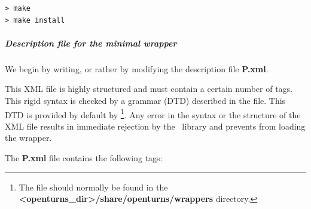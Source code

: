 \lstset{language=Bash, basicstyle=\normalsize}
\begin{lstlisting}[frame=TBRL]
> make
> make install
\end{lstlisting}

\subparagraph{Description file for the minimal wrapper}

We begin by writing, or rather by modifying the description file {\bf P.xml}.

This XML file is highly structured and must contain a certain number of tags. This rigid syntax is checked by a grammar (DTD) described in the  file. This DTD is provided by default by \OT\footnote{The file should normally be found in the {\bf <openturns\_dir>/share/openturns/wrappers} directory.}. Any error in the syntax or the structure of the XML file results in immediate rejection by the \OT\ library and prevents from loading the wrapper.

The {\bf P.xml} file contains the following tags:

